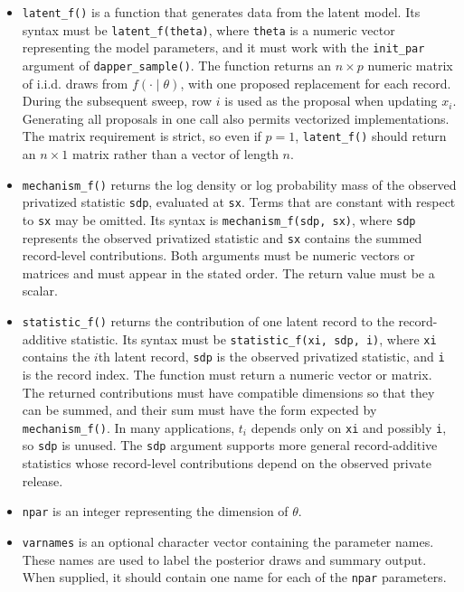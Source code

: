 \begin{itemize}
  using a lightweight, well-documented package such as . When
  \texttt{posterior\_f()} uses an MCMC sampler rather than a direct conjugate draw, each
  call may perform one or more transitions targeting the conditional posterior.
  This may include an adaptive sampler, provided that its adaptation scheme is
  valid for the overall MCMC algorithm. The computational implications of choosing
  the number of inner transitions are discussed in Section \hyperref[sec:benchmarks]{6.1}.
\item
  \texttt{latent\_f()} is a function that generates data from the latent model. Its syntax
  must be \texttt{latent\_f(theta)}, where \texttt{theta} is a numeric vector representing the model
  parameters, and it must work with the \texttt{init\_par} argument of \texttt{dapper\_sample()}.
  The function returns an \(n \times p\) numeric matrix of i.i.d. draws from
  \(f(\cdot \mid \theta)\), with one proposed replacement for each record. During the
  subsequent sweep, row \(i\) is used as the proposal when updating \(x_i\). Generating
  all proposals in one call also permits vectorized implementations. The matrix
  requirement is strict, so even if \(p = 1\), \texttt{latent\_f()} should return an
  \(n \times 1\) matrix rather than a vector of length \(n\).
\item
  \texttt{mechanism\_f()} returns the log density or log probability mass of the observed
  privatized statistic \texttt{sdp}, evaluated at \texttt{sx}. Terms that are constant with respect
  to \texttt{sx} may be omitted. Its syntax is
  \texttt{mechanism\_f(sdp,\ sx)}, where \texttt{sdp} represents the observed privatized statistic
  and \texttt{sx} contains the summed record-level contributions. Both arguments must be
  numeric vectors or matrices and must appear in the stated order. The return
  value must be a scalar.
\item
  \texttt{statistic\_f()} returns the contribution of one latent record to the
  record-additive statistic. Its syntax must be \texttt{statistic\_f(xi,\ sdp,\ i)}, where \texttt{xi} contains the \(i\)th
  latent record, \texttt{sdp} is the observed privatized statistic, and \texttt{i} is the
  record index. The function must return a numeric vector or matrix. The returned
  contributions must have compatible dimensions so that they can be summed, and
  their sum must have the form expected by
  \texttt{mechanism\_f()}. In many applications, \(t_i\) depends only on \texttt{xi} and possibly
  \texttt{i}, so \texttt{sdp} is unused. The \texttt{sdp} argument supports more general record-additive
  statistics whose record-level contributions depend on the observed
  private release.
\item
  \texttt{npar} is an integer representing the dimension of \(\theta\).
\item
  \texttt{varnames} is an optional character vector containing the parameter names.
  These names are used to label the posterior draws and summary output. When
  supplied, it should contain one name for each of the \texttt{npar} parameters.
\end{itemize}

